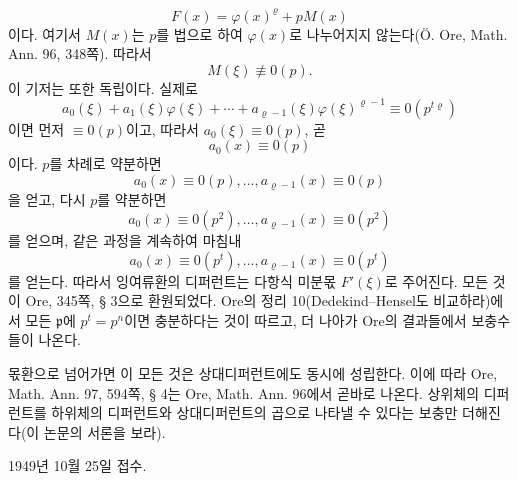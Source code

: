 \[
F(x)=\varphi(x)^\varrho+pM(x)
\]
이다. 여기서 \(M(x)\)는 \(p\)를 법으로 하여 \(\varphi(x)\)로 나누어지지 않는다(Ö. Ore, Math. Ann. 96, 348쪽). 따라서
\[
M(\xi)\not\equiv0(p).
\]
이 기저는 또한 독립이다. 실제로
\[
a_0(\xi)+a_1(\xi)\varphi(\xi)+\cdots+a_{\varrho-1}(\xi)\varphi(\xi)^{\varrho-1}
\equiv0(p^{t\varrho})
\]
이면 먼저 \(\equiv0(p)\)이고, 따라서 \(a_0(\xi)\equiv0(p)\), 곧
\[
a_0(x)\equiv0(p)
\]
이다. \(p\)를 차례로 약분하면
\[
a_0(x)\equiv0(p),\ldots,a_{\varrho-1}(x)\equiv0(p)
\]
을 얻고, 다시 \(p\)를 약분하면
\[
a_0(x)\equiv0(p^2),\ldots,a_{\varrho-1}(x)\equiv0(p^2)
\]
를 얻으며, 같은 과정을 계속하여 마침내
\[
a_0(x)\equiv0(p^t),\ldots,a_{\varrho-1}(x)\equiv0(p^t)
\]
를 얻는다. 따라서 잉여류환의 디퍼런트는 다항식 미분몫 \(F'(\xi)\)로 주어진다. 모든 것이 Ore, 345쪽, § 3으로 환원되었다. Ore의 정리 10(Dedekind--Hensel도 비교하라)에서 모든 \(\mathfrak p\)에 \(p^t=p^n\)이면 충분하다는 것이 따르고, 더 나아가 Ore의 결과들에서 보충수들이 나온다.

몫환으로 넘어가면 이 모든 것은 상대디퍼런트에도 동시에 성립한다. 이에 따라 Ore, Math. Ann. 97, 594쪽, § 4는 Ore, Math. Ann. 96에서 곧바로 나온다. 상위체의 디퍼런트를 하위체의 디퍼런트와 상대디퍼런트의 곱으로 나타낼 수 있다는 보충만 더해진다(이 논문의 서론을 보라).

\begin{center}
1949년 10월 25일 접수.
\end{center}

